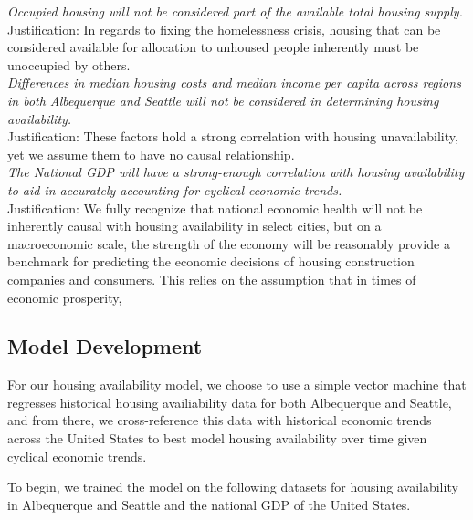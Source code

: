 \documentclass[12pt]{article}
\begin{document}
\noindent
\textit{Occupied housing will not be considered part of the available total housing supply.} \\

\noindent
Justification: In regards to fixing the homelessness crisis, housing that can be considered available for allocation to
unhoused people inherently must be unoccupied by others. \\

\noindent
\textit{Differences in median housing costs and median income per capita across regions in both Albequerque and Seattle
will not be considered in determining housing availability.} \\

\noindent
Justification: These factors hold a strong correlation with housing unavailability, yet we assume them to have no
causal relationship. \\

\noindent
\textit{The National GDP will have a strong-enough correlation with housing availability to aid in accurately
accounting for cyclical economic trends.} \\

\noindent
Justification: We fully recognize that national economic health will not be inherently causal with housing availability
in select cities, but on a macroeconomic scale, the strength of the economy will be reasonably provide a benchmark for
predicting the economic decisions of housing construction companies and consumers.
This relies on the assumption that in times of economic prosperity,

\subsection{Model Development}
For our housing availability model, we choose to use a simple vector machine that regresses historical housing availiability
data for both Albequerque and Seattle, and from there, we cross-reference this data with historical economic trends
across the United States to best model housing availability over time given cyclical economic trends.

\noindent
To begin, we trained the model on the following datasets for housing availability in Albequerque and Seattle and the
national GDP of the United States.
\end{document}

